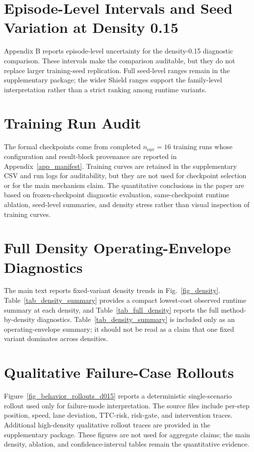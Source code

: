 \documentclass[pdflatex,sn-mathphys-ay]{sn-jnl}
\begin{document}
\begin{appendices}
\section{Episode-Level Intervals and Seed Variation at Density 0.15}\label{app_ci}
\setcounter{table}{0}
\setcounter{figure}{0}
Appendix B reports episode-level uncertainty for the density-0.15 diagnostic comparison. These intervals make the comparison auditable, but they do not replace larger training-seed replication. Full seed-level ranges remain in the supplementary package; the wider Shield ranges support the family-level interpretation rather than a strict ranking among runtime variants.


\FloatBarrier

\section{Training Run Audit}\label{app_training_dynamics}
\setcounter{table}{0}
\setcounter{figure}{0}
The formal checkpoints come from completed $n_{\mathrm{env}}=16$ training runs whose configuration and result-block provenance are reported in Appendix~\ref{app_manifest}. Training curves are retained in the supplementary CSV and run logs for auditability, but they are not used for checkpoint selection or for the main mechanism claim. The quantitative conclusions in the paper are based on frozen-checkpoint diagnostic evaluation, same-checkpoint runtime ablation, seed-level summaries, and density stress rather than visual inspection of training curves.
\FloatBarrier

\section{Full Density Operating-Envelope Diagnostics}\label{app_density}
\setcounter{table}{0}
\setcounter{figure}{0}
The main text reports fixed-variant density trends in Fig.~\ref{fig_density}. Table~\ref{tab_density_summary} provides a compact lowest-cost observed runtime summary at each density, and Table~\ref{tab_full_density} reports the full method-by-density diagnostics. Table~\ref{tab_density_summary} is included only as an operating-envelope summary; it should not be read as a claim that one fixed variant dominates across densities.




\section{Qualitative Failure-Case Rollouts}\label{app_failure_rollouts}
\setcounter{table}{0}
\setcounter{figure}{0}
Figure~\ref{fig_behavior_rollouts_d015} reports a deterministic single-scenario rollout used only for failure-mode interpretation. The source files include per-step position, speed, lane deviation, TTC-risk, risk-gate, and intervention traces. Additional high-density qualitative rollout traces are provided in the supplementary package. These figures are not used for aggregate claims; the main density, ablation, and confidence-interval tables remain the quantitative evidence.


\end{appendices}
\end{document}
